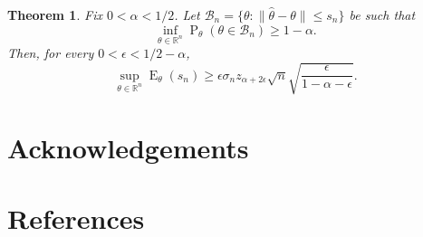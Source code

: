 \documentclass[11pt, letterpaper]{article}
\DeclareMathOperator{\myP}{P}
\DeclareMathOperator{\myE}{E}
\theoremstyle{plain}
\newtheorem{theorem}{\quad\quad Theorem}
\theoremstyle{definition}
\theoremstyle{remark}
\begin{document}
\begin{theorem}
    Fix $0<\alpha<1/2$. Let $\mathcal{B}_n=\{\theta:\|\hat{\theta}-\theta\|\leq s_n\}$ be such that
    $$
    \inf_{\theta\in \mathbb{R}^n} \myP_{\theta}(\theta\in \mathcal{B}_n)\geq 1-\alpha.
    $$
    Then, for every $0<\epsilon<1/2-\alpha$,
    $$
    \sup_{\theta\in \mathbb{R}^n} \myE_{\theta}(s_n)\geq \epsilon \sigma_n z_{\alpha+2\epsilon}\sqrt{n}\sqrt{\frac{\epsilon}{1-\alpha-\epsilon}}.
    $$

\end{theorem}
\section*{Acknowledgements}


\section*{References}



\end{document}
